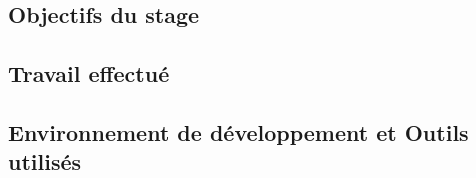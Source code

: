 \subsection{Objectifs du stage}


\subsection{Travail effectué}


\subsection{Environnement de développement et Outils utilisés}

